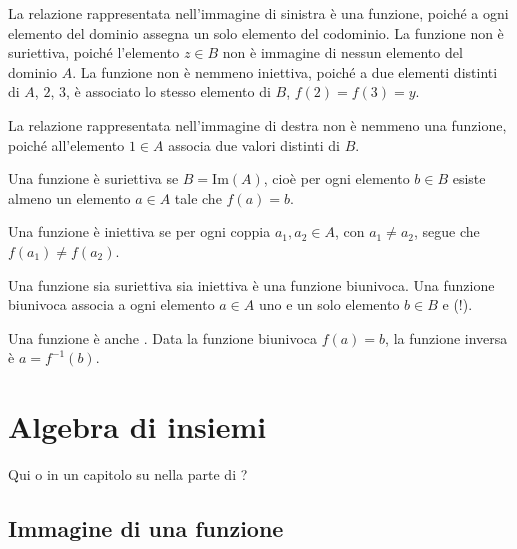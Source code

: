 \documentclass[letterpaper,10pt,italian]{jupyterBook}
\begin{document}
\sphinxAtStartPar
La relazione rappresentata nell’immagine di sinistra è una funzione, poiché a ogni elemento del dominio assegna un solo elemento del codominio. La funzione non è suriettiva, poiché l’elemento \(z \in B\) non è immagine di nessun elemento del dominio \(A\). La funzione non è nemmeno iniettiva, poiché a due elementi distinti di \(A\), \(2\), \(3\), è associato lo stesso elemento di \(B\), \(f(2) = f(3) = y\).

\sphinxAtStartPar
La relazione rappresentata nell’immagine di destra non è nemmeno una funzione, poiché all’elemento \(1 \in A\) associa due valori distinti di \(B\).

\sphinxAtStartPar
{} Una funzione è suriettiva se \(B = \text{Im}(A)\), cioè per ogni elemento \(b \in B\) esiste almeno un elemento \(a \in A\) tale che \(f(a) = b\).

\sphinxAtStartPar
{} Una funzione è iniettiva se per ogni coppia \(a_1, a_2 \in A\), con \(a_1 \ne a_2\), segue che \(f(a_1) \ne f(a_2)\).

\sphinxAtStartPar
{} Una funzione sia suriettiva sia iniettiva è una funzione biunivoca. Una funzione biunivoca associa a ogni elemento \(a \in A\) uno e un solo elemento \(b \in B\) e (!).

\sphinxAtStartPar
Una funzione  è anche . Data la funzione biunivoca \(f(a) = b\), la funzione inversa è \(a = f^{-1}(b)\).


\section{Algebra di insiemi}
\label{\detokenize{ch/set:algebra-di-insiemi}}\label{\detokenize{ch/set:math-hs-set-algebra}}
\sphinxAtStartPar
{} Qui o in un capitolo su {\hyperref[\detokenize{ch/algebra/set-algebra-link:math-hs-algebra-set-link}]{}} nella parte di {\hyperref[\detokenize{ch/algebra:math-hs-algebra}]{}}?


\subsection{Immagine di una funzione}
\label{\detokenize{ch/set:immagine-di-una-funzione}}\label{\detokenize{ch/set:math-hs-fun-range}}
\end{document}
